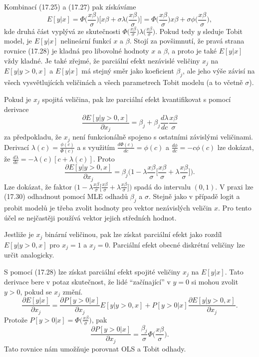 Kombinací (17.25) a (17.27) pak získáváme
\begin{equation}
E[y|x] = \Phi\Big(\frac{x \beta}{\sigma}\Big)\Big[x \beta + \sigma \lambda\Big(\frac{x \beta}{\sigma}\Big)\Big] = \Phi\Big(\frac{x \beta}{\sigma}\Big)x \beta + \sigma \phi\Big(\frac{x \beta}{\sigma}\Big),
\end{equation}
kde druhá část vyplývá ze skutečnosti $\Phi\Big(\frac{x \beta}{ \sigma}\Big) \lambda\Big(\frac{x \beta}{\sigma}\Big)$. Pokud tedy $y$ sleduje Tobit model, je $E[y|x]$ nelineární funkcí $x$ a $\beta$. Stojí za povšimnutí, že pravá strana rovnice (17.28) je kladná pro libovolné hodnoty $x$ a $\beta$, a proto je také $E[y|x]$ vždy kladné. Je také zřejmé, že parciální efekt nezávislé veličiny $x_j$ na $E[y|y>0,x]$ a $E[y|x]$ má stejný směr jako koeficient $\beta_j$, ale jeho výše závisí na všech vysvětlujících veličinách a všech parametrech Tobit modelu (a to včetně $\sigma$).

Pokud je $x_j$ spojitá veličina, pak lze parciální efekt kvantifikovat s pomocí derivace
\begin{equation}
\frac{\partial E[y|y>0, x]}{\partial x_j} = \beta_j + \beta_j \frac{d \lambda}{dc}\frac{x \beta}{\sigma}
\end{equation}
za předpokladu, že $x_j$ není funkcionálně spojeno s ostatními závislými veličinami. Derivací $\lambda(c) = \frac{\phi(c)}{\Phi(c)}$ a s využitím $\frac{d \Phi(c)}{dc} = \phi(c)$ a $\frac{d \phi}{d c} = -c \phi(c)$ lze dokázat, že $\frac{d \lambda}{dc} = - \lambda(c)[c + \lambda(c)]$. Proto
\begin{equation}
\frac{\partial E[y|y > 0, x]}{\partial x_j} = \beta_j\Big(1 - \lambda \frac{x \beta}{\sigma}\Big[\frac{x \beta}{\sigma} + \lambda \frac{x \beta}{\sigma}\Big]\Big).
\end{equation}
Lze dokázat, že faktor $\Big(1 - \lambda \frac{x \beta}{\sigma}\Big[\frac{x \beta}{\sigma} + \lambda \frac{x \beta}{\sigma}\Big]\Big)$ spadá do intervalu $(0, 1)$. V praxi lze (17.30)  odhadnout pomocí MLE odhadů $\beta_j$ a $\sigma$. Stejně jako v případě logit a probit modelů je třeba zvolit hodnoty pro vektor nezávislých veličin $x$. Pro tento účel se nejčastěji používá vektor jejich středních hodnot.

Jestliže je $x_j$ binární veličinou, pak lze získat parciální efekt jako rozdíl $E[y|y > 0, x]$ pro $x_j = 1$ a $x_j = 0$. Parciální efekt obecné diskrétní veličiny lze určit analogicky.

S pomocí (17.28) lze získat parciální efekt spojité veličiny $x_j$ na $E[y|x]$. Tato derivace bere v potaz skutečnost, že lidé ``začínající'' v $y = 0$ si mohou zvolit $y > 0$, pokud se $x_j$ změní.
\begin{equation}
\frac{\partial E[y|x]}{\partial x_j} = \frac{\partial P[y > 0 | x]}{\partial x_j} E[y | y > 0, x] + P[y > 0 | x] \frac{\partial E[y | y > 0, x]}{\partial x_j}.
\end{equation}
Protože $P[y > 0 | x] = \Phi\Big(\frac{x \beta}{\sigma}\Big)$, pak
\begin{equation}
\frac{\partial P[y > 0 | x]}{\partial x_j} = \frac{\beta_j}{\sigma} \Phi\Big(\frac{x \beta}{\sigma}\Big).
\end{equation}
Tato rovnice nám umožňuje porovnat OLS a Tobit odhady.

